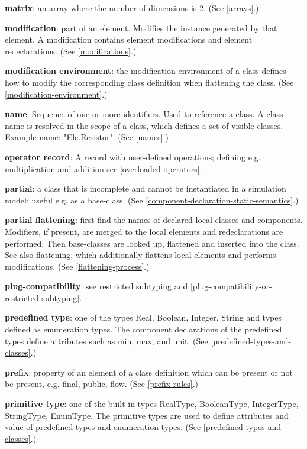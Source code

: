 \documentclass[10pt,a4paper]{report}
\begin{document}
\textbf{matrix}: an array where the number of dimensions is 2. (See
\ref{arrays}.)

\textbf{modification}: part of an element. Modifies the instance
generated by that element. A modification contains element modifications
and element redeclarations. (See \ref{modifications}.)

\textbf{modification environment}: the modification environment of a
class defines how to modify the corresponding class definition when
flattening the class. (See \ref{modification-environment}.)

\textbf{name}: Sequence of one or more identifiers. Used to reference a
class. A class name is resolved in the scope of a class, which defines a
set of visible classes. Example name: "Ele.Resistor". (See \ref{names}.)

\textbf{operator record}: A record with user-defined operations;
defining e.g. multiplication and addition see \ref{overloaded-operators}.

\textbf{partial}: a class that is incomplete and cannot be instantiated
in a simulation model; useful e.g. as a base-class. (See \ref{component-declaration-static-semantics}.)

\textbf{partial flattening}: first find the names of declared local
classes and components. Modifiers, if present, are merged to the local
elements and redeclarations are performed. Then base-classes are looked
up, flattened and inserted into the class. See also flattening, which
additionally flattens local elements and performs modifications. (See
\ref{flattening-process}.)

\textbf{plug-compatibility}: see restricted subtyping and \ref{plug-compatibility-or-restricted-subtyping}.

\textbf{predefined type}: one of the types Real, Boolean, Integer,
String and types defined as enumeration types. The component
declarations of the predefined types define attributes such as min, max,
and unit. (See \ref{predefined-types-and-classes}.)

\textbf{prefix}: property of an element of a class definition which can
be present or not be present, e.g. final, public, flow. (See \ref{prefix-rules}.)

\textbf{primitive type}: one of the built-in types RealType,
BooleanType, IntegerType, StringType, EnumType. The primitive types are
used to define attributes and value of predefined types and enumeration
types. (See \ref{predefined-types-and-classes}.)
\end{document}
